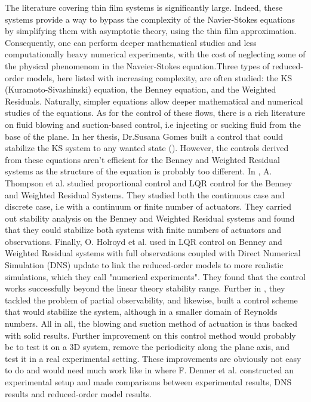 \documentclass[12pt]{article}
\begin{document}
The literature covering thin film systems is significantly large. Indeed, these systems provide a way to bypass the complexity 
of the Navier-Stokes equations by simplifying them with asymptotic theory, using the thin film approximation. Consequently, 
one can perform deeper mathematical studies and less computationally heavy numerical experiments, with the cost of neglecting some of 
the physical phenomenom in the Naveier-Stokes equation.Three types of reduced-order models, here listed with increasing complexity, are 
often studied: the KS (Kuramoto-Sivashinski) equation, the Benney equation, and the Weighted Residuals. Naturally, simpler equations allow deeper 
mathematical and numerical studies of the equations. As for the control of these flows, there is a rich literature on fluid blowing and suction-based control,
 i.e injecting or sucking fluid from the base of the plane. In her thesis, Dr.Susana Gomes built a control that could stabilize the KS system to any 
 wanted state (\cite{Susana_thesis}). However, the controls derived from these equations aren't efficient for the Benney and 
 Weighted Residual systems as the structure of the equation is probably too different. In \cite{Thompson_2016_prop_ctrl}, A. Thompson 
 et al. studied proportional control and LQR control for the Benney and Weighted Residual Systems. They studied both the continuous 
 case and discrete case, i.e with a continuum or finite number of actuators. They carried out stability analysis on the Benney and
  Weighted Residual systems and found that they could stabilize both systems with finite numbers of actuators and observations. 
  Finally, O. Holroyd et al. used in \cite{holroyd2023linearquadraticregulationcontrol} LQR control on Benney and Weighted Residual 
  systems with full observations coupled with Direct Numerical Simulation (DNS) update to link the reduced-order models to more 
  realistic simulations, which they call "numerical experiments". They found that the control works successfully beyond the linear
   theory stability range. Further in \cite{holroyd2024stabilisationfallingliquidfilms}, they tackled the problem of partial observability,
    and likewise, built a control scheme that would stabilize the system, although in a smaller domain of Reynolds numbers. All in all, the
blowing and suction method of actuation is thus backed with solid results. Further improvement on this control method would probably 
be to test it on a 3D system, remove the periodicity along the plane axis, and test it in a real experimental setting. These improvements 
are obviously not easy to do and would need much work like in \cite{Experimental_DNS_Reduced_order_modelling_paper} where F. Denner et al. 
constructed an experimental setup and made comparisons between experimental results, DNS results and reduced-order model results. 
\\
\end{document}
